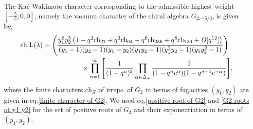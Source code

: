 \documentclass[a4paper,12pt]{article}
\begin{document}
The Ka\v c-Wakimoto character corresponding to the admissible highest weight $[-\frac{5}{3};0,0]$, namely the vacuum character of the chiral algebra $G_{2,-5/3}$, is given by,
%
\begin{align}
   \text{ch L($\lambda$)}& =\left(\frac{y_1^6y_2^5\left(1-q^2\text{ch}_{27}+q^3\text{ch}_{64}-q^6\text{ch}_{286}+q^8\text{ch}_{729}+{\it O}[q^{12}]\right)}{(y_1-1)(y_2-1)(y_1-y_2)(y_1y_2-1)(y_1^2y_2-1)(y_1y_2^2-1)}\right)\nonumber\\
    & \hspace{2cm}\times\prod_{n=1}^\infty\Bigg[\frac{1}{(1-q^n)^{{2}}}\prod_{{\alpha}\in {\Delta}_+}\frac{1}{(1-q^ne^{{\alpha}})(1-q^{n-1}e^{-{\alpha}})}\Bigg],
\end{align}
%
where the finite characters $\text{ch}_{\mathcal{R}}$ of irreps. of $G_2$ in terms of fugacities $(y_1,y_2)$  are given in eq.\eqref{finite character of G2}. We used eq.\eqref{positive root of G2} and \eqref{G2 roots at y1 y2} for the set of positive roots of $G_2$ and their exponentiation in terms of $(y_1,y_2)$.








 
\end{document}
